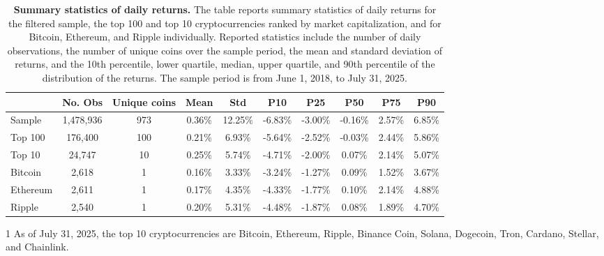 \documentclass[
  12pt,
  a4paper,
  openany]{scrbook}
\begin{document}
\begin{table}[t]
\centering
\caption[Summary statistics of daily returns]{\textbf{Summary statistics of daily returns.} The table reports summary statistics of daily returns for the filtered sample, the top 100 and top 10 cryptocurrencies ranked by market capitalization, and for Bitcoin, Ethereum, and Ripple individually. Reported statistics include the number of daily observations, the number of unique coins over the sample period, the mean and standard deviation of returns, and the 10th percentile, lower quartile, median, upper quartile, and 90th percentile of the distribution of the returns. The sample period is from June 1, 2018, to July 31, 2025.}
\label{tbl-overview}
\vspace{5pt} 
\begin{adjustbox}{max width=\textwidth}
\begin{threeparttable}
\begin{tabular}{lccccccccc}
\toprule
 & No. Obs & Unique coins & Mean & Std & P10 & P25 & P50 & P75 & P90 \\
\midrule
Sample & 1,478,936 & 973 & 0.36\% & 12.25\% & -6.83\% & -3.00\% & -0.16\% & 2.57\% & 6.85\% \\
Top 100 & 176,400 & 100 & 0.21\% & 6.93\% & -5.64\% & -2.52\% & -0.03\% & 2.44\% & 5.86\% \\
Top 10 & 24,747 & 10 & 0.25\% & 5.74\% & -4.71\% & -2.00\% & 0.07\% & 2.14\% & 5.07\% \\
Bitcoin & 2,618 & 1 & 0.16\% & 3.33\% & -3.24\% & -1.27\% & 0.09\% & 1.52\% & 3.67\% \\
Ethereum & 2,611 & 1 & 0.17\% & 4.35\% & -4.33\% & -1.77\% & 0.10\% & 2.14\% & 4.88\% \\
Ripple & 2,540 & 1 & 0.20\% & 5.31\% & -4.48\% & -1.87\% & 0.08\% & 1.89\% & 4.70\% \\
\bottomrule
\end{tabular}
\begin{tablenotes}\footnotesize
\item[1] As of July 31, 2025, the top 10 cryptocurrencies are Bitcoin, Ethereum, Ripple, Binance Coin, Solana, Dogecoin, Tron, Cardano, Stellar, and Chainlink.
\end{tablenotes}
\end{threeparttable}
\end{adjustbox}
\end{table}
\end{document}
